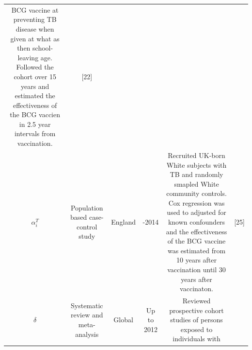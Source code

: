 \documentclass[11pt,twoside]{bristolthesis}
\begin{document}
\begin{longtable}[]{@{}cccccc@{}}
\begin{minipage}[t]{0.27\columnwidth}
  BCG vaccine at preventing TB disease
  when given at what as then
  school-leaving age. Followed the cohort
  over 15 years and estimated the
  effectiveness of the BCG vaccien in 2.5
  year intervals from vaccination.\strut
  \end{minipage} & \begin{minipage}[t]{0.11\columnwidth}\centering
  {[}22{]}\strut
  \end{minipage}\tabularnewline
  \begin{minipage}[t]{0.21\columnwidth}\centering
  \(\alpha_i^T\)\strut
  \end{minipage} & \begin{minipage}[t]{0.10\columnwidth}\centering
  Population
  based
  case-control
  study\strut
  \end{minipage} & \begin{minipage}[t]{0.07\columnwidth}\centering
  England\strut
  \end{minipage} & \begin{minipage}[t]{0.07\columnwidth}\centering
  2002-2014\strut
  \end{minipage} & \begin{minipage}[t]{0.27\columnwidth}\centering
  Recruited UK-born White subjects with TB
  and randomly smapled White community
  controls. Cox regression was used to
  adjusted for known confounders and the
  effectiveness of the BCG vaccine was
  estimated from 10 years after
  vaccination until 30 years after
  vaccinaton.\strut
  \end{minipage} & \begin{minipage}[t]{0.11\columnwidth}\centering
  {[}25{]}\strut
  \end{minipage}\tabularnewline
  \begin{minipage}[t]{0.21\columnwidth}\centering
  \(\delta\)\strut
  \end{minipage} & \begin{minipage}[t]{0.10\columnwidth}\centering
  Systematic
  review and
  meta-analysis\strut
  \end{minipage} & \begin{minipage}[t]{0.07\columnwidth}\centering
  Global\strut
  \end{minipage} & \begin{minipage}[t]{0.07\columnwidth}\centering
  Up to
  2012\strut
  \end{minipage} & \begin{minipage}[t]{0.27\columnwidth}\centering
  Reviewed prospective cohort studies of
  persons exposed to individuals with

\end{minipage}
\end{longtable}
\end{document}
